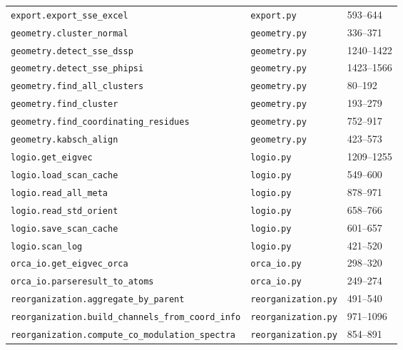 \documentclass[10pt,a4paper,twoside]{article}
\begin{document}
\begin{longtable}{p{} p{} p{}}
\texttt{export.export\_sse\_excel}                     & \texttt{export.py}         & 593--644  \\
\texttt{geometry.cluster\_normal}                     & \texttt{geometry.py}       & 336--371  \\
\texttt{geometry.detect\_sse\_dssp}                    & \texttt{geometry.py}       & 1240--1422 \\
\texttt{geometry.detect\_sse\_phipsi}                  & \texttt{geometry.py}       & 1423--1566 \\
\texttt{geometry.find\_all\_clusters}                 & \texttt{geometry.py}       & 80--192   \\
\texttt{geometry.find\_cluster}                       & \texttt{geometry.py}       & 193--279  \\
\texttt{geometry.find\_coordinating\_residues}        & \texttt{geometry.py}       & 752--917  \\
\texttt{geometry.kabsch\_align}                       & \texttt{geometry.py}       & 423--573  \\
\texttt{logio.get\_eigvec}                            & \texttt{logio.py}          & 1209--1255 \\
\texttt{logio.load\_scan\_cache}                      & \texttt{logio.py}          & 549--600  \\
\texttt{logio.read\_all\_meta}                        & \texttt{logio.py}          & 878--971  \\
\texttt{logio.read\_std\_orient}                      & \texttt{logio.py}          & 658--766  \\
\texttt{logio.save\_scan\_cache}                      & \texttt{logio.py}          & 601--657  \\
\texttt{logio.scan\_log}                              & \texttt{logio.py}          & 421--520  \\
\texttt{orca\_io.get\_eigvec\_orca}                   & \texttt{orca\_io.py}       & 298--320  \\
\texttt{orca\_io.parseresult\_to\_atoms}              & \texttt{orca\_io.py}       & 249--274  \\
\texttt{reorganization.aggregate\_by\_parent}         & \texttt{reorganization.py} & 491--540  \\
\texttt{reorganization.build\_channels\_from\_coord\_info} & \texttt{reorganization.py} & 971--1096 \\
\texttt{reorganization.compute\_co\_modulation\_spectra} & \texttt{reorganization.py} & 854--891 \\

\end{longtable}
\end{document}
